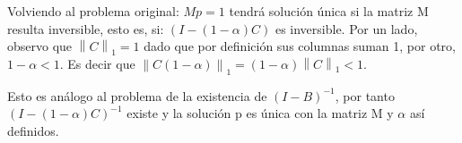 \documentclass{article}
\newcommand{\norm}[2]{\left \lVert #1 \right \rVert_{#2}}
\begin{document}
\begin{enumerate}
Volviendo al problema original: $ Mp = 1$ tendrá solución única si la matriz M resulta inversible, esto es, si: $(I - (1-\alpha)C)$ es inversible.
Por un lado, observo que $\norm{C}{1} = 1$ dado que por definición sus columnas suman 1, por otro, $1-\alpha< 1$. \newline
\newline
Es decir que $\norm{C(1-\alpha)}{1} = (1-\alpha)\norm{C}{1} < 1$.

Esto es análogo al problema de la existencia de $(I-B)^{-1}$, por tanto $(I - (1-\alpha)C)^{-1}$ existe y la solución p es única con la matriz M y $\alpha$ así definidos.


\end{enumerate}
\end{document}
